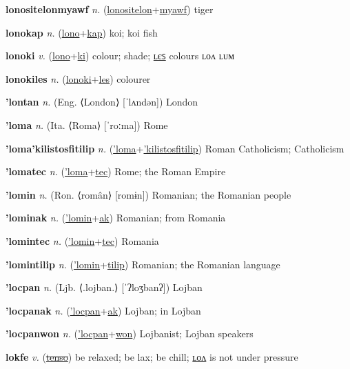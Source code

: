 \textbf{\hypertarget{lonositelonmyawf}{lonositelonmyawf}} \textit{n.} (\hyperlink{lonositelon}{lonositelon}+\allowbreak \hyperlink{myawf}{myawf})
tiger

\textbf{\hypertarget{lonokap}{lonokap}} \textit{n.} (\hyperlink{lono}{lono}+\allowbreak \hyperlink{kap}{kap})
koi; koi fish

\textbf{\hypertarget{lonoki}{lonoki}} \textit{v.} (\hyperlink{lono}{lono}+\allowbreak \hyperlink{ki}{ki})
colour; shade; \hyperlink{lonokiles}{ʟєꜱ} colours ʟᴏᴧ ʟᴜᴍ

\textbf{\hypertarget{lonokiles}{lonokiles}} \textit{n.} (\hyperlink{lonoki}{lonoki}+\allowbreak \hyperlink{les}{les})
colourer

\textbf{\hypertarget{'lontan}{'lontan}} \textit{n.} (Eng. ⟨London⟩ [ˈlʌndən])
London

\textbf{\hypertarget{'loma}{'loma}} \textit{n.} (Ita. ⟨Roma⟩ [ˈroːma])
Rome

\textbf{\hypertarget{'loma'kilistosfitilip}{'loma'kilistosfitilip}} \textit{n.} (\hyperlink{'loma}{'loma}+\allowbreak \hyperlink{'kilistosfitilip}{'kilistosfitilip})
Roman Catholicism; Catholicism

\textbf{\hypertarget{'lomatec}{'lomatec}} \textit{n.} (\hyperlink{'loma}{'loma}+\allowbreak \hyperlink{tec}{tec})
Rome; the Roman Empire

\textbf{\hypertarget{'lomin}{'lomin}} \textit{n.} (Ron. ⟨român⟩ [romɨn])
Romanian; the Romanian people

\textbf{\hypertarget{'lominak}{'lominak}} \textit{n.} (\hyperlink{'lomin}{'lomin}+\allowbreak \hyperlink{ak}{ak})
Romanian; from Romania

\textbf{\hypertarget{'lomintec}{'lomintec}} \textit{n.} (\hyperlink{'lomin}{'lomin}+\allowbreak \hyperlink{tec}{tec})
Romania

\textbf{\hypertarget{'lomintilip}{'lomintilip}} \textit{n.} (\hyperlink{'lomin}{'lomin}+\allowbreak \hyperlink{tilip}{tilip})
Romanian; the Romanian language

\textbf{\hypertarget{'locpan}{'locpan}} \textit{n.} (Ljb. ⟨.lojban.⟩ [ˈʔloʒbanʔ])
Lojban

\textbf{\hypertarget{'locpanak}{'locpanak}} \textit{n.} (\hyperlink{'locpan}{'locpan}+\allowbreak \hyperlink{ak}{ak})
Lojban; in Lojban

\textbf{\hypertarget{'locpanwon}{'locpanwon}} \textit{n.} (\hyperlink{'locpan}{'locpan}+\allowbreak \hyperlink{won}{won})
Lojbanist; Lojban speakers

\textbf{\hypertarget{lokfe}{lokfe}} \textit{v.} (\hyperlink{tenso}{\sout{tenso}})
be relaxed; be lax; be chill; \hyperlink{lokfelon}{ʟᴏᴧ} is not under pressure

